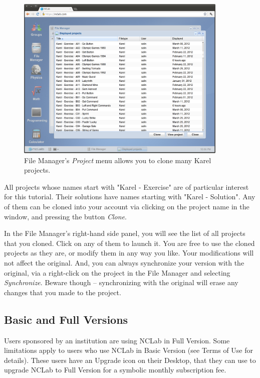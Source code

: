 \documentclass[article,A4,12pt]{llncs}
\begin{document}
\begin{figure}[!ht]
\begin{center}
\includegraphics[width=0.9\textwidth]{img/cloning.png}
\end{center}
\caption{File Manager's {\em Project} menu allows you to clone many Karel projects.}
\label{fig:cloning}
\end{figure}
\noindent
All projects whose names start with "Karel - Exercise" are of particular interest 
for this tutorial. Their solutions have names starting with "Karel - Solution". 
Any of them can be cloned into your account via clicking on the project name in the window, 
and pressing the button {\em Clone}.

In the File Manager's right-hand side panel, you will see the list of all 
projects that you cloned. Click on any of them to launch it. You are free to 
use the cloned projects as they are, or modify them in any way you like. Your 
modifications will not affect the original. And, you can 
always synchronize your version with the original, via 
a right-click on the project in the File Manager and selecting {\em Synchronize}.
Beware though -- synchronizing with the original will erase any changes that 
you made to the project.

\subsection{Basic and Full Versions}

Users sponsored by an institution are using NCLab in Full Version. Some limitations 
apply to users who use NCLab in Basic Version (see Terms of Use for details). These 
users have an Upgrade icon on their Desktop, that they can use to upgrade 
NCLab to Full Version for a symbolic monthly subscription fee.
\end{document}
